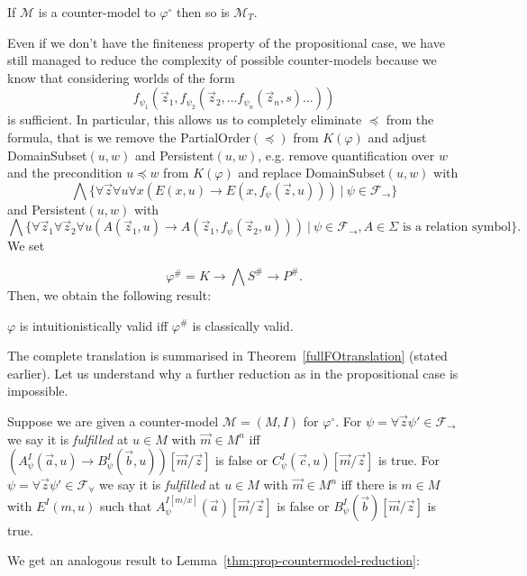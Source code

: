 \documentclass[runningheads]{llncs}
\begin{document}
\begin{lemma}
	If $\mathcal M$ is a counter-model to $\varphi^\circ$ then so is $\mathcal M_T$.
\end{lemma}

Even if we don't have the finiteness property of the propositional case, we have still managed to reduce the complexity of possible counter-models because we know that considering worlds of the form $$f_{\psi_1}(\vec z_1, f_{\psi_2}(\vec z_2, \dots f_{\psi_n}(\vec z_n, s)\dots))$$ is sufficient.
In particular, this allows us to completely eliminate $\preceq$ from the formula, that is we remove the PartialOrder$(\preceq)$
from $K(\varphi)$ and adjust DomainSubset$(u, w)$ and Persistent$(u, w)$, e.g. remove quantification over $w$ and the precondition $u\preceq w$ from $K(\varphi)$ and replace DomainSubset$(u, w)$ with
$$\bigwedge\{\forall \vec z\forall u\forall x(E(x, u)\to E(x, f_\psi(\vec z, u)))\:|\:\psi\in\mathcal F_\to\}$$ and Persistent$(u, w)$ with $$\bigwedge\{\forall\vec z_1\forall\vec z_2\forall u(A(\vec z_1, u)\to A(\vec z_1, f_\psi(\vec z_2, u)))\:|\:\psi\in\mathcal F_\to, \text{$A\in\Sigma$ is a relation symbol}\}.$$ We set

$$\varphi^{\#} = K\to \bigwedge S^\#\to P^\#.$$
Then, we obtain the following result:
\begin{theorem}
	\label{thm:fo-reduction}
	$\varphi$ is intuitionistically valid iff $\varphi^\#$ is classically valid.
\end{theorem}
The complete translation is summarised in Theorem~\ref{fullFOtranslation} (stated earlier). Let us understand why a further reduction as in the propositional case is impossible.


\begin{definition}
\label{def:fo-fulfilled}
	Suppose we are given a counter-model $\mathcal M = (M, I)$ for $\varphi^\circ$. For $\psi = \forall\vec z\psi'\in\mathcal F_\to$ we say it is \emph{fulfilled} at $u\in M$ with $\vec m\in M^n$ iff $(A_\psi^I(\vec a, u)\to B_\psi^I(\vec b, u))[\vec m/\vec z]$ is false or $C_\psi^I(\vec c, u)[\vec m/\vec z]$ is true.
	For $\psi = \forall\vec z\psi'\in\mathcal F_\forall$ we say it is \emph{fulfilled} at $u\in M$ with $\vec m\in M^n$ iff there is $m\in M$ with $E^{I}(m, u)$ such that $A^{I[m/x]}_\psi(\vec a)[\vec m/\vec z]$ is false or $B_\psi^I(\vec b)[\vec m/\vec z]$ is true.
\end{definition}

We get an analogous result to Lemma~\ref{thm:prop-countermodel-reduction}:
\end{document}
